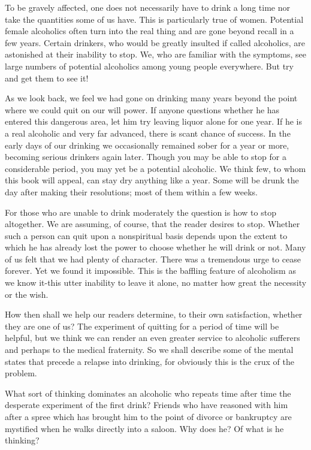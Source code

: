 \begin{biblechapter}
\verseWithHeading{}

To be gravely affected, one does not necessarily have to drink a long time 
nor take the quantities some of us have. 
This is particularly true of women. 
Potential female alcoholics often turn into the real thing 
and are gone beyond recall in a few years. 
Certain drinkers, who would be greatly insulted if called alcoholics, 
are astonished at their inability to stop. 
We, who are familiar with the symptoms, 
see large numbers of potential alcoholics among young people everywhere. 
But try and get them to see it!  

As we look back, 
we feel we had gone on drinking many years beyond the point where we could quit on our will power. 
If anyone questions whether he has entered this dangerous area, 
let him try leaving liquor alone for one year. 
If he is a real alcoholic and very far advanced, there is scant chance of success. 
In the early days of our drinking we occasionally remained sober for a year or more, 
becoming serious drinkers again later. 
Though you may be able to stop for a considerable period, you may yet be a potential alcoholic. 
We think few, to whom this book will appeal, can stay dry anything like a year. 
Some will be drunk the day after making their resolutions; 
most of them within a few weeks.
\end{biblechapter}


\begin{biblechapter}

For those who are unable to drink moderately the question is how to stop altogether. 
We are assuming, of course, that the reader desires to stop. 
Whether such a person can quit upon a nonspiritual basis 
depends upon the extent to which he has already lost the power to choose whether he will drink or not. 
Many of us felt that we had plenty of character. 
There was a tremendous urge to cease forever. 
Yet we found it impossible. 
This is the baffling feature of alcoholism as we know it-this utter inability to leave it alone, 
no matter how great the necessity or the wish.

How then shall we help our readers determine, to their own satisfaction, 
whether they are one of us? 
The experiment of quitting for a period of time will be helpful, 
but we think we can render an even greater service to alcoholic sufferers 
and perhaps to the medical fraternity. 
So we shall describe some of the mental states that precede a relapse into drinking, 
for obviously this is the crux of the problem.

What sort of thinking dominates an alcoholic who repeats time after time the desperate experiment of the first drink? 
Friends who have reasoned with him after a spree which has brought him to the point of divorce or bankruptcy 
are mystified when he walks directly into a saloon. 
Why does he? 
Of what is he thinking?
\end{biblechapter}


